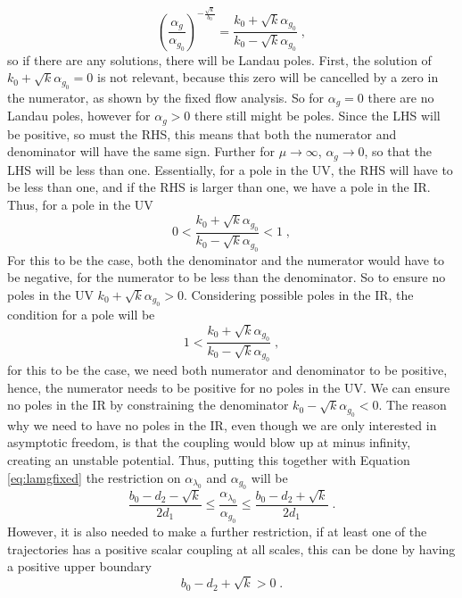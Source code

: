 \begin{equation}
    \left(\frac{\alpha_g}{\alpha_{g_0}}\right)^{-\frac{\sqrt{k}}{b_0}}=\frac{k_0+\sqrt{k}\alpha_{g_0}}{k_0-\sqrt{k}\alpha_{g_0}}\;,
\end{equation}
so if there are any solutions, there will be Landau poles. First, the solution of $k_0+\sqrt{k}\alpha_{g_0}=0$ is not relevant, because this zero will be cancelled by a zero in the numerator, as shown by the fixed flow analysis. So for $\alpha_g=0$ there are no Landau poles, however for $\alpha_g>0$ there still might be poles. Since the LHS will be positive, so must the RHS, this means that both the numerator and denominator will have the same sign. Further for $\mu\to \infty$, $\alpha_g\to0$, so that the LHS will be less than one. Essentially, for a pole in the UV, the RHS will have to be less than one, and if the RHS is larger than one, we have a pole in the IR. Thus, for a pole in the UV
\begin{equation}
    0<\frac{k_0+\sqrt{k}\alpha_{g_0}}{k_0-\sqrt{k}\alpha_{g_0}}<1\;,
\end{equation}
For this to be the case, both the denominator and the numerator would have to be negative, for the numerator to be less than the denominator. So to ensure no poles in the UV $k_0+\sqrt{k}\alpha_{g_0}>0$. Considering possible poles in the IR, the condition for a pole will be
\begin{equation}
    1<\frac{k_0+\sqrt{k}\alpha_{g_0}}{k_0-\sqrt{k}\alpha_{g_0}}\;,
\end{equation}
for this to be the case, we need both numerator and denominator to be positive, hence, the numerator needs to be positive for no poles in the UV. We can ensure no poles in the IR by constraining the denominator $k_0-\sqrt{k}\alpha_{g_0}<0$. The reason why we need to have no poles in the IR, even though we are only interested in asymptotic freedom, is that the coupling would blow up at minus infinity, creating an unstable potential. Thus, putting this together with Equation \ref{eq:lamgfixed} the restriction on $\alpha_{\lambda_0}$ and $\alpha_{g_0}$ will be
\begin{equation}
    \frac{b_0-d_2-\sqrt{k}}{2d_1}\le \frac{\alpha_{\lambda_0}}{\alpha_{g_0}}\le \frac{b_0-d_2+\sqrt{k}}{2d_1}\;.
\end{equation}
However, it is also needed to make a further restriction, if at least one of the trajectories has a positive scalar coupling at all scales, this can be done by having a positive upper boundary
\begin{equation}
    {b_0-d_2+\sqrt{k}}>0\;.
\end{equation}
